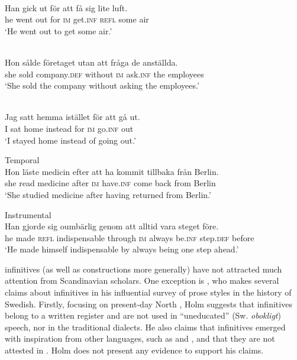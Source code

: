 \documentclass[output=paper]{langscibook}
\begin{document}
\ea
\label{ex:kalm:1}
\ea {}\label{ex:kalm:1a}\\
\gll Han gick ut för att få sig lite luft.\\
he went out for \textsc{im} get.\textsc{inf} \textsc{refl} some air\\
\glt ‘He went out to get some air.’

\ex {}\label{ex:kalm:1b}\\
\gll Hon sålde företaget utan att fråga de anställda.\\
she sold company.\textsc{def} without \textsc{im} ask.\textsc{inf} the employees\\
\glt ‘She sold the company without asking the employees.’

\ex {}\label{ex:kalm:1c}\\
\gll Jag satt hemma istället för att gå ut.\\
I sat home instead for \textsc{im} go.\textsc{inf} out\\
\glt‘I stayed home instead of going out.’

\ex Temporal\label{ex:kalm:1d}\\
\gll Hon läste medicin efter att ha kommit tillbaka från Berlin.\\
she read medicine after \textsc{im} have.\textsc{inf} come back from Berlin\\
\glt ‘She studied medicine after having returned from Berlin.’

\ex Instrumental\label{ex:kalm:1e}\\
\gll Han gjorde sig oumbärlig genom att alltid vara steget före.\\
he made \textsc{refl} indispensable through \textsc{im} always be.\textsc{inf} step.\textsc{def} before\\
\glt ‘He made himself indispensable by always being one step ahead.’
\z
\z

 infinitives (as well as  constructions more generally) have not attracted much attention from Scandinavian scholars. One exception is \citet{Holm1967}, who makes several claims about  infinitives in his influential survey of prose styles in the history of Swedish. Firstly, focusing on present-day North , Holm suggests that  infinitives belong to a written register and are not used in “uneducated” (Sw. \textit{obokligt}) speech, nor in the traditional dialects. He also claims that  infinitives emerged with inspiration from other languages, such as  and , and that they are not attested in  \citep[27]{Holm1967}. Holm does not present any evidence to support his claims. 
\end{document}
